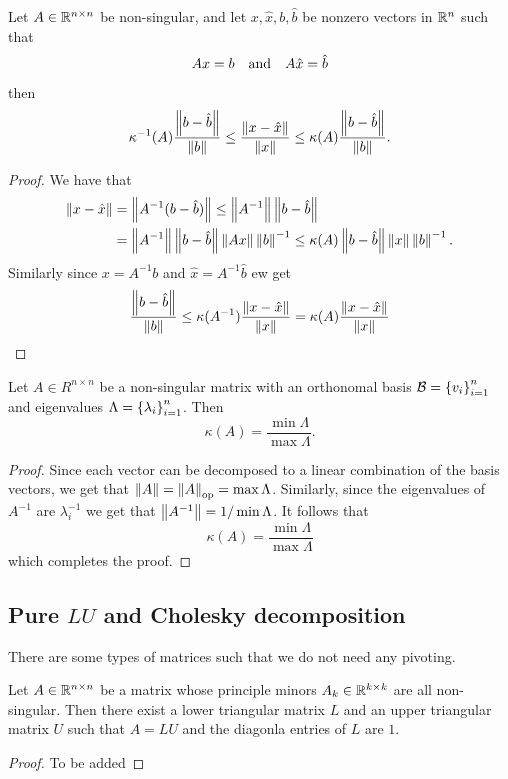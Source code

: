 \documentclass[11pt,a4paper]{article}
\begin{document}
\begin{theorem}
  Let $A \in \mathbb{R}^{n \times n}$ be non-singular,
  and let $x, \hat x, b, \hat b$ be nonzero vectors in $\mathbb{R}^n$
  such that
  \[
    Ax = b \quad \text{and} \quad
    A \hat x = \hat b
  \]
  then
  \[
    \kappa^{-1}(A) \frac{\left\lVert b - \hat b\right\rVert}{\left\lVert b\right\rVert} \le
    \frac{\left\lVert x - \hat x\right\rVert}{\left\lVert x\right\rVert} \le
    \kappa(A) \frac{\left\lVert b - \hat b\right\rVert}{\left\lVert b\right\rVert}.
  \]
\end{theorem}
\begin{proof}
  We have that
  \begin{align*}
    \left\lVert x - \hat x\right\rVert &= \left\lVert A^{-1}(b - \hat b)\right\rVert \le
    \left\lVert A^{-1}\right\rVert \left\lVert b - \hat b\right\rVert \\ &=
    \left\lVert A^{-1}\right\rVert \left\lVert b - \hat b\right\rVert \left\lVert Ax\right\rVert \left\lVert b\right\rVert^{-1} \le
    \kappa(A) \left\lVert b - \hat b\right\rVert \left\lVert x\right\rVert \left\lVert b\right\rVert^{-1}.
  \end{align*}
  Similarly since $x = A^{-1} b$ and $\hat x = A^{-1} \hat b$ ew get
  \[
    \frac{\left\lVert b - \hat b\right\rVert}{\left\lVert b\right\rVert} \le
    \kappa(A^{-1}) \frac{\left\lVert x - \hat x\right\rVert}{\left\lVert x\right\rVert} =
    \kappa(A) \frac{\left\lVert x - \hat x\right\rVert}{\left\lVert x\right\rVert}
  \]
\end{proof}

\begin{theorem}
  Let $A \in R^{n \times n}$ be a non-singular matrix with an orthonomal
  basis $\mathcal B = \left\{v_i\right\}_{i=1}^{n}$ and eigenvalues
  $\Lambda = \left\{\lambda_i\right\}_{i=1}^{n}$.
  Then
  \[
    \kappa(A) = \frac{\min \Lambda}{\max \Lambda}.
  \]
\end{theorem}
\begin{proof}
  Since each vector can be decomposed to a linear combination of the basis
  vectors, we get that $\left\lVert A\right\rVert = \left\lVert A\right\rVert_{\operatorname{op}} = \max \Lambda$.
  Similarly, since the eigenvalues of $A^{-1}$ are $\lambda_i^{-1}$ we
  get that $\left\lVert A^{-1}\right\rVert = 1 / \min \Lambda$.
  It follows that
  \[
    \kappa(A) = \frac{\min \Lambda}{\max \Lambda}
  \]
  which completes the proof.
\end{proof}

\subsection{Pure \texorpdfstring{$LU$}{LU} and Cholesky decomposition}

There are some types of matrices such that we do not need any pivoting.

\begin{theorem}
  Let $A \in \mathbb{R}^{n \times n}$ be a matrix whose principle minors
  $A_k \in \mathbb{R}^{k \times k}$ are all non-singular.
  Then there exist a lower triangular matrix $L$ and an upper triangular
  matrix $U$ such that $A = LU$ and the diagonla entries of $L$ are $1$.
\end{theorem}
\begin{proof}
  To be added
\end{proof}
\end{document}
